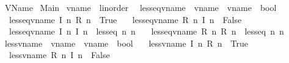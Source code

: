 %
\begin{isabellebody}%
%
%
\isadelimtheory
%
\endisadelimtheory
%
\isatagtheory
{}\isamarkupfalse%
\ VName\isanewline
{}\ Main\isanewline
{}%
\endisatagtheory
{\isafoldtheory}%
%
\isadelimtheory
%
\endisadelimtheory
%
\isamarkupfalse%
\ vname\ {\isacharcolon}{\isacharcolon}\ linorder\ \isanewline
{}\isamarkupfalse%
\ less{\isacharunderscore}eq{\isacharunderscore}vname\ {\isacharcolon}{\isacharcolon}\ {\isachardoublequoteopen}vname\ {\isasymRightarrow}\ vname\ {\isasymRightarrow}\ bool{\isachardoublequoteclose}\ \isanewline
\ \ {\isachardoublequoteopen}less{\isacharunderscore}eq{\isacharunderscore}vname\ {\isacharparenleft}I\ n{}{\isacharparenright}\ {\isacharparenleft}R\ n{}{\isacharparenright}\ {\isacharequal}\ True{\isachardoublequoteclose}\ {\isacharbar}\isanewline
\ \ {\isachardoublequoteopen}less{\isacharunderscore}eq{\isacharunderscore}vname\ {\isacharparenleft}R\ n{}{\isacharparenright}\ {\isacharparenleft}I\ n{}{\isacharparenright}\ {\isacharequal}\ False{\isachardoublequoteclose}\ {\isacharbar}\isanewline
\ \ {\isachardoublequoteopen}less{\isacharunderscore}eq{\isacharunderscore}vname\ {\isacharparenleft}I\ n{}{\isacharparenright}\ {\isacharparenleft}I\ n{}{\isacharparenright}\ {\isacharequal}\ less{\isacharunderscore}eq\ n{}\ n{}{\isachardoublequoteclose}\ {\isacharbar}\isanewline
\ \ {\isachardoublequoteopen}less{\isacharunderscore}eq{\isacharunderscore}vname\ {\isacharparenleft}R\ n{}{\isacharparenright}\ {\isacharparenleft}R\ n{}{\isacharparenright}\ {\isacharequal}\ less{\isacharunderscore}eq\ n{}\ n{}{\isachardoublequoteclose}\isanewline
\isanewline
{}\isamarkupfalse%
\ less{\isacharunderscore}vname\ {\isacharcolon}{\isacharcolon}\ {\isachardoublequoteopen}vname\ {\isasymRightarrow}\ vname\ {\isasymRightarrow}\ bool{\isachardoublequoteclose}\ \isanewline
\ \ {\isachardoublequoteopen}less{\isacharunderscore}vname\ {\isacharparenleft}I\ n{}{\isacharparenright}\ {\isacharparenleft}R\ n{}{\isacharparenright}\ {\isacharequal}\ True{\isachardoublequoteclose}\ {\isacharbar}\isanewline
\ \ {\isachardoublequoteopen}less{\isacharunderscore}vname\ {\isacharparenleft}R\ n{}{\isacharparenright}\ {\isacharparenleft}I\ n{}{\isacharparenright}\ {\isacharequal}\ False{\isachardoublequoteclose}\ {\isacharbar}\isanewline

\end{isabellebody}
